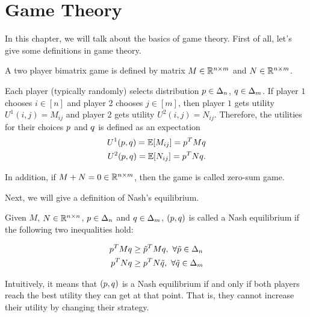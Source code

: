 \documentclass[../main.tex]{subfiles}
\begin{document}
\chapter{Game Theory}
In this chapter, we will talk about the basics of game theory. First of all, let's give some definitions in game theory.

\begin{definition}
	A two player bimatrix game is defined by matrix $M \in \mathbb{R}^{n\times m}$ and $N \in \mathbb{R}^{n\times m}$. 
	
	Each player (typically randomly) selects distribution $p \in \Delta_n$, $q \in \Delta_m$. If player $1$ chooses $i\in [n]$ and player 2 chooses $j \in [m]$, then player $1$ gets utility $U^1(i,j) = M_{ij}$ and player $2$ gets utility $U^2(i,j) = N_{ij}$. Therefore, the utilities for their choices $p$ and $q$ is defined as an expectation
	\begin{equation}
	\begin{aligned}
	U^1(p,q) = \mathbb{E}[M_{ij}] = p^T M q \\
	U^2(p,q) = \mathbb{E}[N_{ij}] = p^T Nq .
	\end{aligned}
	\end{equation}
\end{definition}
	In addition, if $M + N = 0 \in \mathbb{R}^{n\times m}$, then the game is called zero-sum game.
	
	Next, we will give a definition of Nash's equilibrium.
	
	\begin{definition}
		Given $M$, $N \in \mathbb{R}^{n\times n}$, $p \in \Delta_n$ and $q \in \Delta_m$, $(p,q)$ is called a Nash equilibrium if the following two inequalities hold:
		
		\begin{equation}
			\begin{aligned}
				p^T M q &\geq \tilde{p}^T M q,\ \forall \tilde{p} \in \Delta_n \\
				p^T N q &\geq p^T N \tilde{q},\ \forall \tilde{q} \in \Delta_m 
			\end{aligned}
		\end{equation}
		
		Intuitively, it means that $(p, q)$ is a Nash equilibrium if and only if both players reach the best utility they can get at that point. That is, they cannot increase their utility by changing their strategy.
	\end{definition}
\end{document}
